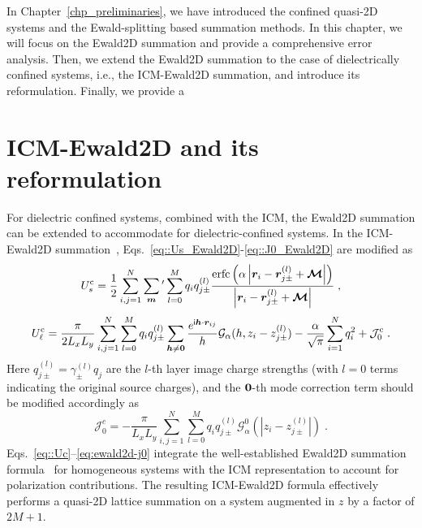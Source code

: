In Chapter~\ref{chp_preliminaries}, we have introduced the confined quasi-2D systems and the Ewald-splitting based summation methods.
In this chapter, we will focus on the Ewald2D summation and provide a comprehensive error analysis.
Then, we extend the Ewald2D summation to the case of dielectrically confined systems, i.e., the ICM-Ewald2D summation, and introduce its reformulation.
Finally, we provide a

\section{ICM-Ewald2D and its reformulation}\label{sec::icm_ewald2d}

For dielectric confined systems, combined with the ICM, the Ewald2D summation can be extended to accommodate for dielectric-confined systems.
In the ICM-Ewald2D summation~\cite{gan2024random}, Eqs.~\eqref{eq::Us_Ewald2D}-\eqref{eq::J0_Ewald2D} are modified as
\begin{equation}\label{eq::Uc}
    U_{s}^{\text{c}} =  \frac{1}{2} \sum_{i,j=1}^N \sum_{\bm{m}}{}^\prime \sum_{l=0}^M q_iq_{j \pm}^{(l)} \frac{\text{erfc}\left(\alpha \left|\bm{r}_i - \bm{r}_{j\pm}^{(l)}+ \boldsymbol{\mathcal{M}}\right|\right)}{\left|\bm{r}_i-\bm{r}_{j\pm}^{(l)}+\boldsymbol{\mathcal{M}}\right|}\;,
\end{equation}
\begin{equation}\label{eq::Fourier2D}
    U^{\text{c}}_{\ell} =  \frac{\pi}{2L_xL_y}\sum_{i, j=1}^N \sum_{l = 0}^{M} q_iq_{j \pm}^{(l)} \sum_{\boldsymbol{h}\neq \boldsymbol{0}}\frac{e^{\mathsf i \boldsymbol{h}\cdot \boldsymbol{r}_{ij}}}{h}\mathcal{G}_{\alpha}(h,z_i - z_{j \pm}^{(l)})  - \frac{\alpha}{\sqrt{\pi}}\sum_{i=1}^{N}q_i^2+\mathcal{J}^{\text{c}}_0\;.
\end{equation}
Here $q_{j\pm}^{(l)}=\gamma_{\pm}^{(l)}q_j$ are the $l$-th layer image charge  strengths (with $l = 0$ terms indicating the original source charges), and the $\boldsymbol{0}$-th mode correction term should be modified accordingly as 
\begin{equation}\label{eq:ewald2d-j0}
    \mathcal J_0^c = -\frac{\pi}{L_xL_y}\sum_{i,j=1}^{N}\sum_{l=0}^{M} q_iq_{j\pm}^{(l)}\mathcal{G}_{\alpha}^0(|z_i-z_{j\pm}^{(l)}|)\;.
\end{equation}
Eqs.~\eqref{eq::Uc}--\eqref{eq:ewald2d-j0} integrate the well-established Ewald2D summation formula~\cite{parry1975electrostatic,zhonghanhu2014JCTC} for homogeneous systems with the ICM representation to account for polarization contributions. 
The resulting ICM-Ewald2D formula effectively performs a quasi-2D lattice summation on a system augmented in $z$ by a factor of $2M+1$. 
